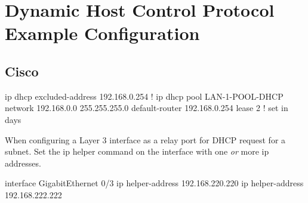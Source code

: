 \section[DHCP Example Configuration]{Dynamic Host Control Protocol Example Configuration}

\subsection{Cisco}

\begin{txt}
    ip dhcp excluded-address 192.168.0.254
    !
    ip dhcp pool LAN-1-POOL-DHCP
    network 192.168.0.0 255.255.255.0
    default-router 192.168.0.254
    lease 2 ! set in days
\end{txt}

When configuring a Layer 3 interface as a relay port for DHCP request for a subnet. Set the ip helper command on the interface with one \textit{or} more ip addresses.

\begin{txt}
    interface GigabitEthernet 0/3
    ip helper-address 192.168.220.220
    ip helper-address 192.168.222.222
\end{txt}

